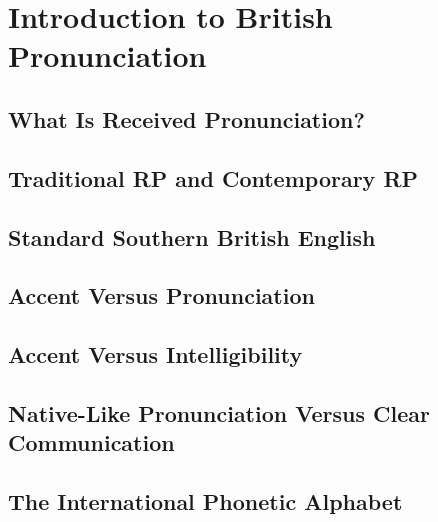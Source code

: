 \chapter{Introduction to British Pronunciation}

\section{What Is Received Pronunciation?}
\section{Traditional RP and Contemporary RP}
\section{Standard Southern British English}
\section{Accent Versus Pronunciation}
\section{Accent Versus Intelligibility}
\section{Native-Like Pronunciation Versus Clear Communication}
\section{The International Phonetic Alphabet}